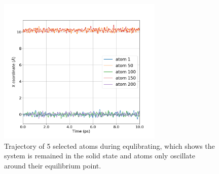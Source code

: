 \begin{figure}[!htbp]
	\begin{center}
		\includegraphics[width=0.7\textwidth]{figs/task3-positions.png} 
		\caption{Trajectory of 5 selected atoms during equlibrating, which shows the system is remained in the solid state and atoms only oscillate around their equilibrium point.}
		\label{fig3-4}
	\end{center}
\end{figure}

